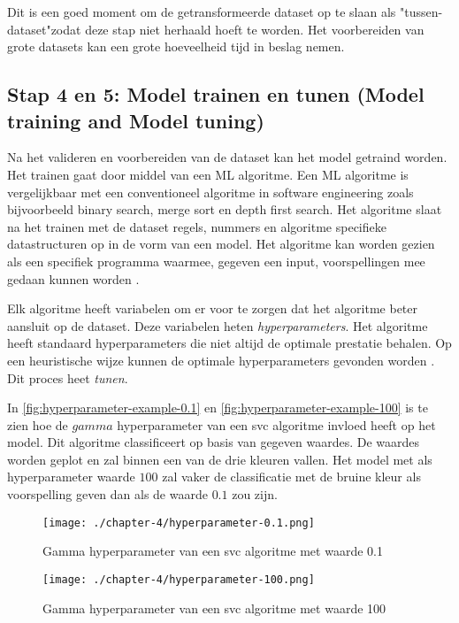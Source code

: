 Dit is een goed moment om de getransformeerde dataset op te slaan als "tussen-dataset"\space zodat deze stap niet herhaald hoeft te worden. Het voorbereiden van grote datasets kan een grote hoeveelheid tijd in beslag nemen.

\subsection{Stap 4 en 5: Model trainen en tunen (Model training and Model tuning)}\label{subsec:ch4-model-trainen-en-tunen}
Na het valideren en voorbereiden van de dataset kan het model getraind worden. Het trainen gaat door middel van een ML algoritme. Een ML algoritme is vergelijkbaar met een conventioneel algoritme in software engineering zoals bijvoorbeeld binary search, merge sort en depth first search. Het algoritme slaat na het trainen met de dataset regels, nummers en algoritme specifieke datastructuren op in de vorm van een model. Het algoritme kan worden gezien als een specifiek programma waarmee, gegeven een input, voorspellingen mee gedaan kunnen worden \cite{ml-algorithm-model-difference}.

Elk algoritme heeft variabelen om er voor te zorgen dat het algoritme beter aansluit op de dataset. Deze variabelen heten \textit{hyperparameters}. Het algoritme heeft standaard hyperparameters die niet altijd de optimale prestatie behalen. Op een heuristische wijze kunnen de optimale hyperparameters gevonden worden \cite{ml-model-hyper-parameter-brownlee}. Dit proces heet \textit{tunen}.

In \autoref{fig:hyperparameter-example-0.1} en \autoref{fig:hyperparameter-example-100} is te zien hoe de \(gamma\) hyperparameter van een \acrfull{svc} algoritme invloed heeft op het model. Dit algoritme classificeert op basis van gegeven waardes. De waardes worden geplot en zal binnen een van de drie kleuren vallen. Het model met als hyperparameter waarde \(100\) zal vaker de classificatie met de bruine kleur als voorspelling geven dan als de waarde \(0.1\) zou zijn.

\begin{figure}[hbt!]
  \centering
  \begin{minipage}{0.45\textwidth}
      \centering
      \texttt{[image: ./chapter-4/hyperparameter-0.1.png]}
      \caption{Gamma hyperparameter van een \acrfull{svc} algoritme met waarde 0.1}
      \label{fig:hyperparameter-example-0.1}
  \end{minipage}\hfill
  \begin{minipage}{0.45\textwidth}
      \centering
      \texttt{[image: ./chapter-4/hyperparameter-100.png]}
      \caption{Gamma hyperparameter van een \acrfull{svc} algoritme met waarde 100}
      \label{fig:hyperparameter-example-100}
  \end{minipage}
\end{figure}

